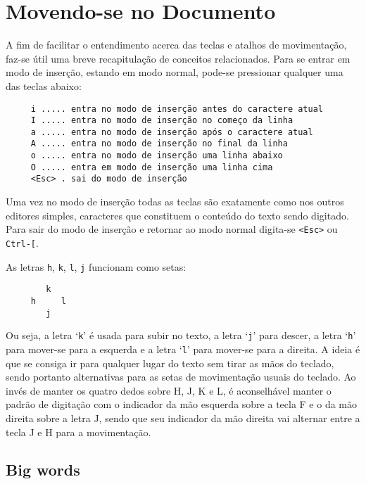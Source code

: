 
\chapter{Movendo-se no Documento}
\label{cha:Movendo-se no Documento}

A fim de facilitar o entendimento acerca das teclas e atalhos de movimentação,
faz-se útil uma breve recapitulação de conceitos relacionados. Para se entrar
em modo de inserção, estando em modo normal, pode-se pressionar qualquer uma
das teclas abaixo:

\begin{verbatim}
     i ..... entra no modo de inserção antes do caractere atual
     I ..... entra no modo de inserção no começo da linha
     a ..... entra no modo de inserção após o caractere atual
     A ..... entra no modo de inserção no final da linha
     o ..... entra no modo de inserção uma linha abaixo
     O ..... entra em modo de inserção uma linha cima
     <Esc> . sai do modo de inserção
\end{verbatim}

Uma vez no modo de inserção todas as teclas são exatamente como nos
outros editores simples, caracteres que constituem o conteúdo do texto sendo
digitado.  Para sair do modo de inserção e retornar ao modo normal digita-se
\verb+<Esc>+ ou \verb+Ctrl-[+.

As letras {\tt h}, {\tt k}, {\tt l}, {\tt j} funcionam como setas:

\begin{verbatim}
        k
     h     l
        j
\end{verbatim}

Ou seja, a letra `{\tt k}' é usada para subir no texto, a letra `{\tt j}' para descer,
a letra `{\tt h}' para mover-se para a esquerda e a letra `{\tt l}' para mover-se para
a direita. A ideia é que se consiga ir para qualquer lugar do texto sem tirar
as mãos do teclado, sendo portanto alternativas para as setas de movimentação
usuais do teclado. Ao invés de manter os quatro dedos sobre H, J, K e L, é aconselhável 
manter o padrão de digitação com o indicador da mão esquerda sobre a tecla F e o da mão
direita sobre a letra J, sendo que seu indicador da mão direita vai alternar entre a
tecla J e H para a movimentação.

\section{Big words}
\label{Big words}

